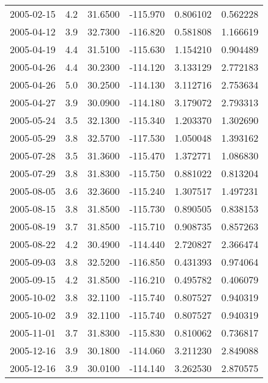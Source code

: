 \begin{tabular}{lrrrrr}
2005-02-15 &       4.2 &  31.6500 &  -115.970 &         0.806102 &         0.562228 \\
2005-04-12 &       3.9 &  32.7300 &  -116.820 &         0.581808 &         1.166619 \\
2005-04-19 &       4.4 &  31.5100 &  -115.630 &         1.154210 &         0.904489 \\
2005-04-26 &       4.4 &  30.2300 &  -114.120 &         3.133129 &         2.772183 \\
2005-04-26 &       5.0 &  30.2500 &  -114.130 &         3.112716 &         2.753634 \\
2005-04-27 &       3.9 &  30.0900 &  -114.180 &         3.179072 &         2.793313 \\
2005-05-24 &       3.5 &  32.1300 &  -115.340 &         1.203370 &         1.302690 \\
2005-05-29 &       3.8 &  32.5700 &  -117.530 &         1.050048 &         1.393162 \\
2005-07-28 &       3.5 &  31.3600 &  -115.470 &         1.372771 &         1.086830 \\
2005-07-29 &       3.8 &  31.8300 &  -115.750 &         0.881022 &         0.813204 \\
2005-08-05 &       3.6 &  32.3600 &  -115.240 &         1.307517 &         1.497231 \\
2005-08-15 &       3.8 &  31.8500 &  -115.730 &         0.890505 &         0.838153 \\
2005-08-19 &       3.7 &  31.8500 &  -115.710 &         0.908735 &         0.857263 \\
2005-08-22 &       4.2 &  30.4900 &  -114.440 &         2.720827 &         2.366474 \\
2005-09-03 &       3.8 &  32.5200 &  -116.850 &         0.431393 &         0.974064 \\
2005-09-15 &       4.2 &  31.8500 &  -116.210 &         0.495782 &         0.406079 \\
2005-10-02 &       3.8 &  32.1100 &  -115.740 &         0.807527 &         0.940319 \\
2005-10-02 &       3.9 &  32.1100 &  -115.740 &         0.807527 &         0.940319 \\
2005-11-01 &       3.7 &  31.8300 &  -115.830 &         0.810062 &         0.736817 \\
2005-12-16 &       3.9 &  30.1800 &  -114.060 &         3.211230 &         2.849088 \\
2005-12-16 &       3.9 &  30.0100 &  -114.140 &         3.262530 &         2.870575 \\

\end{tabular}

